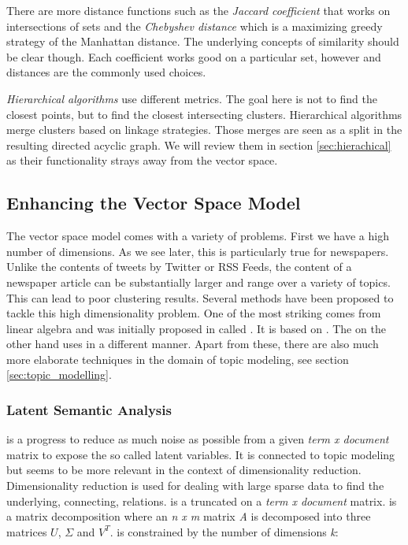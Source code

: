     There are more distance functions such as the \emph{Jaccard coefficient} that works on intersections of sets and the \emph{Chebyshev distance} which is a maximizing greedy strategy of the Manhattan distance. The underlying concepts of similarity should be clear though. Each coefficient works good on a particular set, however \cosine{} and \euclid{} distances are the commonly used choices.

    \emph{Hierarchical algorithms} use different metrics. The goal here is not to find the closest points, but to find the closest intersecting clusters. Hierarchical algorithms merge clusters based on linkage strategies. Those merges are seen as a split in the resulting directed acyclic graph. We will review them in section \ref{sec:hierachical} as their functionality strays away from the vector space.

  \subsection{Enhancing the Vector Space Model}
  \label{sec:evsm}

    The vector space model comes with a variety of problems. First we have a high number of dimensions. As we see later, this is particularly true for newspapers. Unlike the contents of tweets by Twitter or RSS Feeds, the content of a newspaper article can be substantially larger and range over a variety of topics. This can lead to poor clustering results. Several methods have been proposed to tackle this high dimensionality problem. One of the most striking comes from linear algebra and was initially proposed in \cite{DeerwesterLSI1990} called \lsafull{}. It is based on \svdfull{}. The \pcafull{} on the other hand uses \svd{} in a different manner. Apart from these, there are also much more elaborate techniques in the domain of topic modeling, see section \ref{sec:topic_modelling}.

    \subsubsection{Latent Semantic Analysis}
    \label{sec:lsa}
      \lsalong{} is a progress to reduce as much noise as possible from a given \emph{term x document} matrix to expose the so called latent variables. It is connected to topic modeling but seems to be more relevant in the context of dimensionality reduction. Dimensionality reduction is used for dealing with large sparse data to find the underlying, connecting, relations. \lsa{} is a truncated \svdfull{} on a \emph{term x document} matrix. \svd{} is a matrix decomposition where an \emph{n x m} matrix \emph{A} is decomposed into three matrices $U$, $\Sigma$ and $V^{T}$. \lsa{} is constrained by the number of dimensions \emph{k}:

